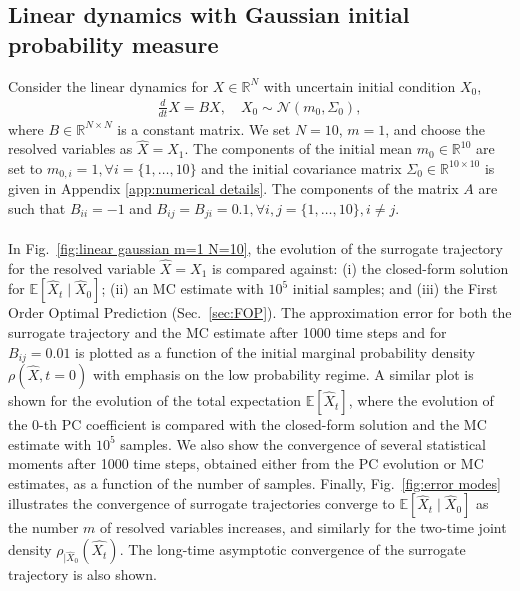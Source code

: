 \documentclass[11pt, a4paper, oneside, reqno]{amsart}
\begin{document}
\subsection{Linear dynamics with Gaussian initial probability measure}\label{sec:linear ode gaussian}
\noindent Consider the linear dynamics for $X\in\mathbb{R}^N$ with uncertain initial condition $X_0$,
\begin{eqnarray}\label{eq:linear system ODE}
    \frac{d}{dt}X = BX,\quad
    X_0 \sim \mathcal{N}(m_0,\Sigma_0),
\end{eqnarray}
where $B \in \mathbb{R}^{N\times N}$ is a constant matrix. 
We set $N=10$, $m=1$, and choose the resolved variables as $\hat{X}=X_1$.
The components of the initial mean $m_0\in\mathbb{R}^{10}$ are set to $m_{0,i}=1, \forall i = \{1,\dots,10\}$ and the initial covariance matrix $\Sigma_0\in\mathbb{R}^{10 \times 10}$ is given in Appendix \ref{app:numerical details}.
The components of the matrix $A$ are such that $B_{ii}=-1$ and $B_{ij}=B_{ji}=0.1, \forall i,j= \{1,\dots,10\}, i\neq j$.
\\ \ \\
In Fig.~\ref{fig:linear gaussian m=1 N=10}, the evolution of the surrogate trajectory for the resolved variable $\hat{X}=X_1$ is compared against: (i) the closed-form solution for $\mathbb{E}[\hat{X}_t\mid\hat{X}_0]$; (ii) an MC estimate with $10^5$ initial samples; and (iii) the First Order Optimal Prediction (Sec.~\ref{sec:FOP}).
The approximation error for both the surrogate trajectory and the MC estimate after 1000 time steps and for $B_{ij}=0.01$ is plotted as a function of the initial marginal probability density $\rho(\hat{X},t=0)$ with emphasis on the low probability regime. 
A similar plot is shown for the evolution of the total expectation $\mathbb{E}[\hat{X}_t]$, where the evolution of the 0-th PC coefficient is compared with the closed-form solution and the MC estimate with $10^5$ samples. 
We also show the convergence of several statistical moments after 1000 time steps, obtained either from the PC evolution or MC estimates, as a function of the number of samples. Finally, Fig.~\ref{fig:error modes} illustrates the convergence of surrogate trajectories converge to $\mathbb{E}[\hat{X}_t\mid\hat{X}_0]$ as the number $m$ of resolved variables increases, and similarly for the two-time joint density $\rho_{|\hat{X}_0}(\hat{X_t})$.
The long-time asymptotic convergence of the surrogate trajectory is also shown. 
\end{document}
